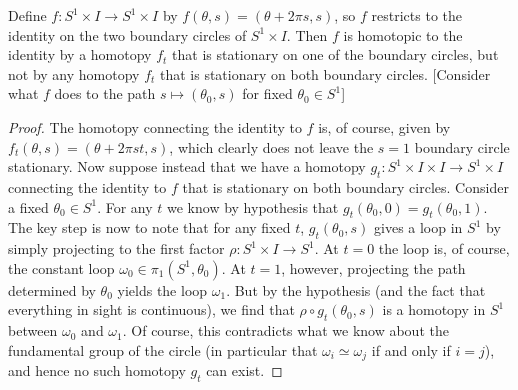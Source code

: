\documentclass{../../mathnotes}
\begin{document}
\begin{prop}
    Define $f:S^1\times I\to S^1\times I$ by $f(\theta,s)=(\theta+2\pi s,s)$, so $f$ restricts to the
    identity on the two boundary circles of $S^1\times I$. Then $f$ is homotopic to the identity by a
    homotopy $f_t$ that is stationary on one of the boundary circles, but not by any homotopy $f_t$ that
    is stationary on both boundary circles. [Consider what $f$ does to the path $s\mapsto(\theta_0,s)$ for
    fixed $\theta_0\in S^1$]
\end{prop}
\begin{proof}
    The homotopy connecting the identity to $f$ is, of course, given by $f_t(\theta,s)=(\theta+2\pi st,s)$,
    which clearly does not leave the $s=1$ boundary circle stationary. Now suppose instead that we have
    a homotopy $g_t:S^1\times I\times I\to S^1\times I$ connecting the identity to $f$ that is stationary
    on both boundary circles. Consider a fixed $\theta_0\in S^1$. For any $t$ we know by hypothesis
    that $g_t(\theta_0,0)=g_t(\theta_0,1)$. The key step is now to note that for any fixed $t$,
    $g_t(\theta_0,s)$ gives a loop in $S^1$ by simply projecting to the first factor $\rho:S^1\times I\to S^1$.
    At $t=0$ the loop is, of course, the constant loop $\omega_0\in\pi_1(S^1,\theta_0)$. At $t=1$, however,
    projecting the path determined by $\theta_0$ yields the loop $\omega_1$. But by the hypothesis (and
    the fact that everything in sight is continuous), we find that $\rho\circ g_t(\theta_0,s)$ is a homotopy
    in $S^1$ between $\omega_0$ and $\omega_1$. Of course, this contradicts what we know about the fundamental
    group of the circle (in particular that $\omega_i\simeq \omega_j$ if and only if $i=j$), and hence no such
    homotopy $g_t$ can exist.
\end{proof}
\end{document}
